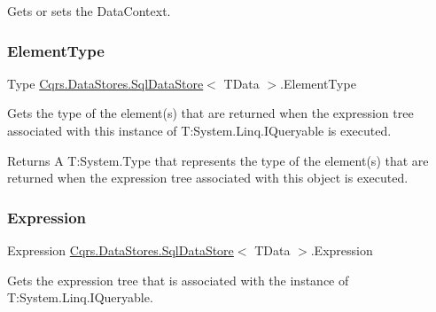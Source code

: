 Gets or sets the Data\+Context. 

\mbox{\label{classCqrs_1_1DataStores_1_1SqlDataStore_ab96bad4f637c7cfc95e97598c8753d02_ab96bad4f637c7cfc95e97598c8753d02}} 
\subsubsection{\texorpdfstring{Element\+Type}{ElementType}}
{\footnotesize\ttfamily Type \hyperlink{classCqrs_1_1DataStores_1_1SqlDataStore}{Cqrs.\+Data\+Stores.\+Sql\+Data\+Store}$<$ T\+Data $>$.Element\+Type\hspace{0.3cm}{\ttfamily [get]}}



Gets the type of the element(s) that are returned when the expression tree associated with this instance of T\+:\+System.\+Linq.\+I\+Queryable is executed. 

\begin{DoxyReturn}{Returns}
A T\+:\+System.\+Type that represents the type of the element(s) that are returned when the expression tree associated with this object is executed. 
\end{DoxyReturn}
\mbox{\label{classCqrs_1_1DataStores_1_1SqlDataStore_a1fb28f14cf7762331ec9e7d5efe19c75_a1fb28f14cf7762331ec9e7d5efe19c75}} 
\subsubsection{\texorpdfstring{Expression}{Expression}}
{\footnotesize\ttfamily Expression \hyperlink{classCqrs_1_1DataStores_1_1SqlDataStore}{Cqrs.\+Data\+Stores.\+Sql\+Data\+Store}$<$ T\+Data $>$.Expression\hspace{0.3cm}{\ttfamily [get]}}



Gets the expression tree that is associated with the instance of T\+:\+System.\+Linq.\+I\+Queryable. 

